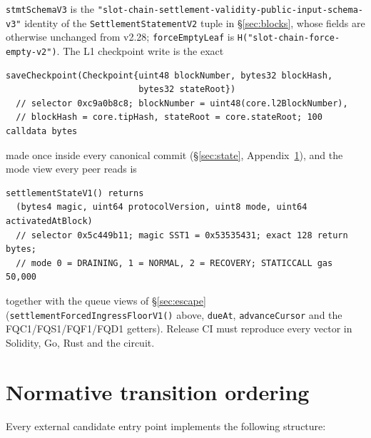 \documentclass[a4paper,11pt]{article}
\newcommand{\code}[1]{\nolinkurl{#1}}
\begin{document}
\code{stmtSchemaV3} is the
\code{"slot-chain-settlement-validity-public-input-schema-v3"} identity of
the \code{SettlementStatementV2} tuple in \S\ref{sec:blocks}, whose fields are
otherwise unchanged from v2.28; \code{forceEmptyLeaf} is
\code{H("slot-chain-force-empty-v2")}.  The L1 checkpoint write is the exact
\begin{verbatim}
saveCheckpoint(Checkpoint{uint48 blockNumber, bytes32 blockHash,
                          bytes32 stateRoot})
  // selector 0xc9a0b8c8; blockNumber = uint48(core.l2BlockNumber),
  // blockHash = core.tipHash, stateRoot = core.stateRoot; 100 calldata bytes
\end{verbatim}
made once inside every canonical commit (\S\ref{sec:state},
Appendix~\ref{app:ordering}), and the mode view every peer reads is
\begin{verbatim}
settlementStateV1() returns
  (bytes4 magic, uint64 protocolVersion, uint8 mode, uint64 activatedAtBlock)
  // selector 0x5c449b11; magic SST1 = 0x53535431; exact 128 return bytes;
  // mode 0 = DRAINING, 1 = NORMAL, 2 = RECOVERY; STATICCALL gas 50,000
\end{verbatim}
together with the queue views of \S\ref{sec:escape}
(\code{settlementForcedIngressFloorV1()} above, \code{dueAt},
\code{advanceCursor} and the FQC1/FQS1/FQF1/FQD1 getters).
Release CI must reproduce every vector in Solidity, Go, Rust and the circuit.
\section{Normative transition ordering}\label{app:ordering}

Every external candidate entry point implements the following structure:
\end{document}
